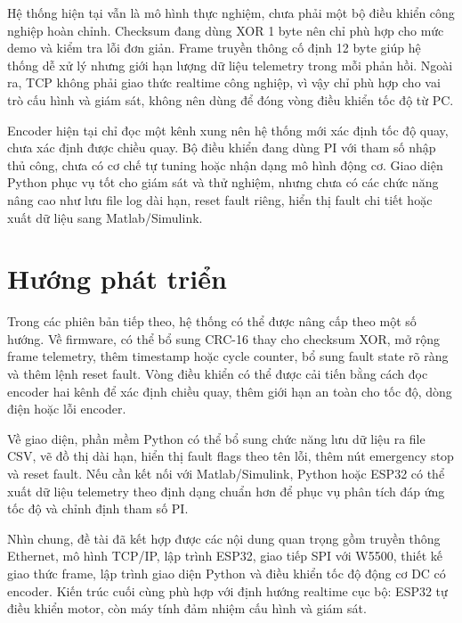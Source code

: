 \documentclass[12pt,a4paper]{report}
\begin{document}
Hệ thống hiện tại vẫn là mô hình thực nghiệm, chưa phải một bộ điều khiển công nghiệp hoàn chỉnh. Checksum đang dùng XOR 1 byte nên chỉ phù hợp cho mức demo và kiểm tra lỗi đơn giản. Frame truyền thông cố định 12 byte giúp hệ thống dễ xử lý nhưng giới hạn lượng dữ liệu telemetry trong mỗi phản hồi. Ngoài ra, TCP không phải giao thức realtime công nghiệp, vì vậy chỉ phù hợp cho vai trò cấu hình và giám sát, không nên dùng để đóng vòng điều khiển tốc độ từ PC.

Encoder hiện tại chỉ đọc một kênh xung nên hệ thống mới xác định tốc độ quay, chưa xác định được chiều quay. Bộ điều khiển đang dùng PI với tham số nhập thủ công, chưa có cơ chế tự tuning hoặc nhận dạng mô hình động cơ. Giao diện Python phục vụ tốt cho giám sát và thử nghiệm, nhưng chưa có các chức năng nâng cao như lưu file log dài hạn, reset fault riêng, hiển thị fault chi tiết hoặc xuất dữ liệu sang Matlab/Simulink.

\section{Hướng phát triển}

Trong các phiên bản tiếp theo, hệ thống có thể được nâng cấp theo một số hướng. Về firmware, có thể bổ sung CRC-16 thay cho checksum XOR, mở rộng frame telemetry, thêm timestamp hoặc cycle counter, bổ sung fault state rõ ràng và thêm lệnh reset fault. Vòng điều khiển có thể được cải tiến bằng cách đọc encoder hai kênh để xác định chiều quay, thêm giới hạn an toàn cho tốc độ, dòng điện hoặc lỗi encoder.

Về giao diện, phần mềm Python có thể bổ sung chức năng lưu dữ liệu ra file CSV, vẽ đồ thị dài hạn, hiển thị fault flags theo tên lỗi, thêm nút emergency stop và reset fault. Nếu cần kết nối với Matlab/Simulink, Python hoặc ESP32 có thể xuất dữ liệu telemetry theo định dạng chuẩn hơn để phục vụ phân tích đáp ứng tốc độ và chỉnh định tham số PI.

Nhìn chung, đề tài đã kết hợp được các nội dung quan trọng gồm truyền thông Ethernet, mô hình TCP/IP, lập trình ESP32, giao tiếp SPI với W5500, thiết kế giao thức frame, lập trình giao diện Python và điều khiển tốc độ động cơ DC có encoder. Kiến trúc cuối cùng phù hợp với định hướng realtime cục bộ: ESP32 tự điều khiển motor, còn máy tính đảm nhiệm cấu hình và giám sát.
\end{document}
